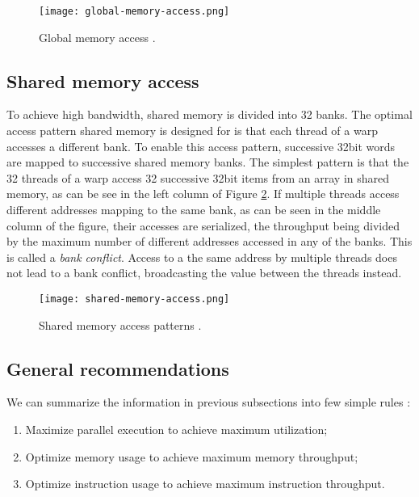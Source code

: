 \begin{figure}[h]
	\centering
	\texttt{[image: global-memory-access.png]}
	\caption{Global memory access \citep{site:cuda}.}
	\label{fig:global_memory_access}
\end{figure}

\subsection{Shared memory access}
To achieve high bandwidth, shared memory is divided into 32 banks. The optimal access pattern shared memory is designed for is that each thread of a warp accesses a different bank. To enable this access pattern, successive 32bit words are mapped to successive shared memory banks. The simplest pattern is that the 32 threads of a warp access 32 successive 32bit items from an array in shared memory, as can be see in the left column of Figure \ref{fig:shared_memory_access}. If multiple threads access different addresses mapping to the same bank, as can be seen in the middle column of the figure, their accesses are serialized, the throughput being divided by the maximum number of different addresses accessed in any of the banks. This is called a \textit{bank conflict}. Access to a the same address by multiple threads does not lead to a bank conflict, broadcasting the value between the threads instead.

\begin{figure}[h]
	\centering
	\texttt{[image: shared-memory-access.png]}
	\caption{Shared memory access patterns \citep{site:cuda}.}
	\label{fig:shared_memory_access}
\end{figure}

\subsection{General recommendations}

We can summarize the information in previous subsections into few simple rules \citep{site:cuda}:

\begin{enumerate}
	\item Maximize parallel execution to achieve maximum utilization;
	\item Optimize memory usage to achieve maximum memory throughput;
	\item Optimize instruction usage to achieve maximum instruction throughput.
\end{enumerate}

